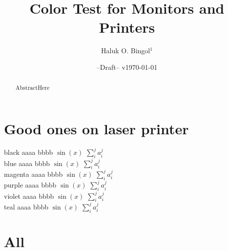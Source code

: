 \documentclass[amsfonts,aps, prl,nofootinbib, twocolumn,showpacs, showkeys,longbibliography]{revtex4-1}
\newcommand{\hbTimeStamp}{{\color{red}--Draft-- v\today}} %
\begin{document}
\title{
	Color Test for Monitors and Printers
}
\author{Haluk O. Bingol$^{1}$}

\date{\hbTimeStamp}

\begin{abstract}
	AbstractHere
\end{abstract}


\maketitle





\section{Good ones on laser printer}
\noindent
{\color{black} black aaaa bbbb $\sin(x)$ $\sum_{i}^{j} a_{i}^{j}$}\\
{\color{blue} blue aaaa bbbb $\sin(x)$ $\sum_{i}^{j} a_{i}^{j}$}\\
{\color{magenta} magenta aaaa bbbb $\sin(x)$ $\sum_{i}^{j} a_{i}^{j}$}\\
{\color{purple} purple aaaa bbbb $\sin(x)$ $\sum_{i}^{j} a_{i}^{j}$}\\
{\color{violet} violet aaaa bbbb $\sin(x)$ $\sum_{i}^{j} a_{i}^{j}$}\\
{\color{teal} teal aaaa bbbb $\sin(x)$ $\sum_{i}^{j} a_{i}^{j}$}\\




\section{All}
\end{document}
